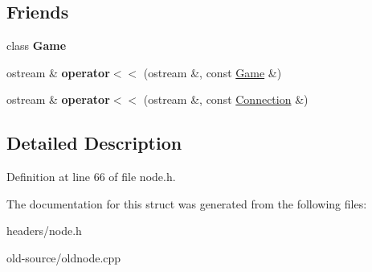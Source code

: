 \subsection*{Friends}
\begin{DoxyCompactItemize}
\item 
\hypertarget{classNode_aa2fab026580d6f14280c2ffb8063a314}{class {\bfseries Game}}\label{classNode_aa2fab026580d6f14280c2ffb8063a314}

\item 
\hypertarget{classNode_a7bb9176e07b6f6c73c930dba6400265f}{ostream \& {\bfseries operator$<$$<$} (ostream \&, const \hyperlink{classGame}{Game} \&)}\label{classNode_a7bb9176e07b6f6c73c930dba6400265f}

\item 
\hypertarget{classNode_a43649da031123d524f6605d2b0b4ebc8}{ostream \& {\bfseries operator$<$$<$} (ostream \&, const \hyperlink{structConnection}{Connection} \&)}\label{classNode_a43649da031123d524f6605d2b0b4ebc8}

\end{DoxyCompactItemize}


\subsection{Detailed Description}


Definition at line 66 of file node.\+h.



The documentation for this struct was generated from the following files\+:\begin{DoxyCompactItemize}
\item 
headers/node.\+h\item 
old-\/source/oldnode.\+cpp\end{DoxyCompactItemize}
